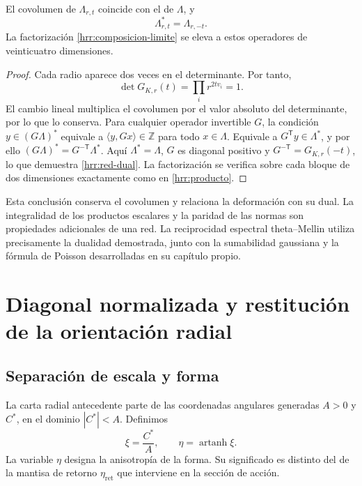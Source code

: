 \begin{proposition}
\label{hrr:redes}
El covolumen de \(\Lambda_{r,t}\) coincide con el de \(\Lambda\), y
\begin{equation}
 \Lambda_{r,t}^{*}=\Lambda_{r,-t}.
 \label{hrr:red-dual}
\end{equation}
La factorización \eqref{hrr:composicion-limite} se eleva a estos
operadores de veinticuatro dimensiones.
\end{proposition}
\begin{proof}
Cada radio aparece dos veces en el determinante. Por tanto,
\[
 \det G_{K,r}(t)=\prod_i r^{2tv_i}=1.
\]
El cambio lineal multiplica el covolumen por el valor absoluto del
determinante, por lo que lo conserva. Para cualquier operador invertible
\(G\), la condición \(y\in(G\Lambda)^*\) equivale a
\(\langle y,Gx\rangle\in\mathbb Z\) para todo \(x\in\Lambda\).
Equivale a \(G^{\mathsf T}y\in\Lambda^*\), y por ello
\((G\Lambda)^*=G^{-\mathsf T}\Lambda^*\). Aquí
\(\Lambda^*=\Lambda\), \(G\) es diagonal positivo y
\(G^{-\mathsf T}=G_{K,r}(-t)\), lo que demuestra
\eqref{hrr:red-dual}. La factorización se verifica sobre cada bloque
de dos dimensiones exactamente como en \eqref{hrr:producto}.
\end{proof}

Esta conclusión conserva el covolumen y relaciona la deformación con
su dual. La integralidad de los productos escalares y la paridad de
las normas son propiedades adicionales de una red. La reciprocidad
espectral theta--Mellin utiliza precisamente la dualidad demostrada,
junto con la sumabilidad gaussiana y la fórmula de Poisson desarrolladas
en su capítulo propio.

\section{Diagonal normalizada y restitución de la orientación radial}
\label{hrr:diagonal}

\subsection{Separación de escala y forma}

La carta radial antecedente parte de las coordenadas angulares generadas
\(A>0\) y \(C^*\), en el dominio \(|C^*|<A\). Definimos
\[
 \xi=\frac{C^*}{A},\qquad
 \eta=\operatorname{artanh}\xi.
\]
La variable \(\eta\) designa la anisotropía de la forma. Su significado
es distinto del de la mantisa de retorno \(\eta_{\mathrm{ret}}\)
que interviene en la sección de acción.

